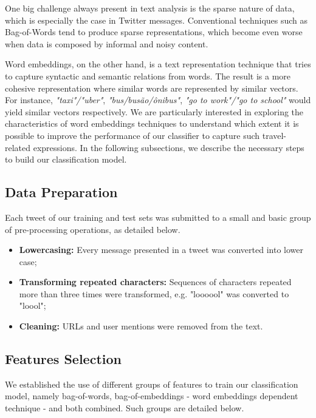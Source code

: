 One big challenge always present in text analysis is the sparse nature of data, which is especially the case in Twitter messages.
Conventional techniques such as Bag-of-Words tend to produce sparse representations, which become even worse when data is composed by informal and noisy content.

Word embeddings, on the other hand, is a text representation technique that tries to capture syntactic and semantic relations from words. The result is a more cohesive representation where similar words are represented by similar vectors. For instance, \emph{"taxi"/"uber"}, \emph{"bus/busão/ônibus"}, \emph{"go to work"/"go to school"} would yield similar vectors respectively.
We are particularly interested in exploring the characteristics of word embeddings techniques to understand which extent it is possible to improve the performance of our classifier to capture such travel-related expressions. In the following subsections, we describe the necessary steps to build our classification model.

\subsection{Data Preparation}
Each tweet of our training and test sets was submitted to a small and basic group of pre-processing operations, as detailed below.

\begin{itemize}
\item \textbf{Lowercasing:} Every message presented in a tweet was converted into lower case;
\item \textbf{Transforming repeated characters:} Sequences of characters repeated more than three times were transformed, e.g. "loooool" was converted to "loool";
\item \textbf{Cleaning:} URLs and user mentions were removed from the text.
\end{itemize}

\subsection{Features Selection}\label{features_4_3_2}
We established the use of different groups of features to train our classification model, namely bag-of-words, bag-of-embeddings - word embeddings dependent technique - and both combined. Such groups are detailed below.

